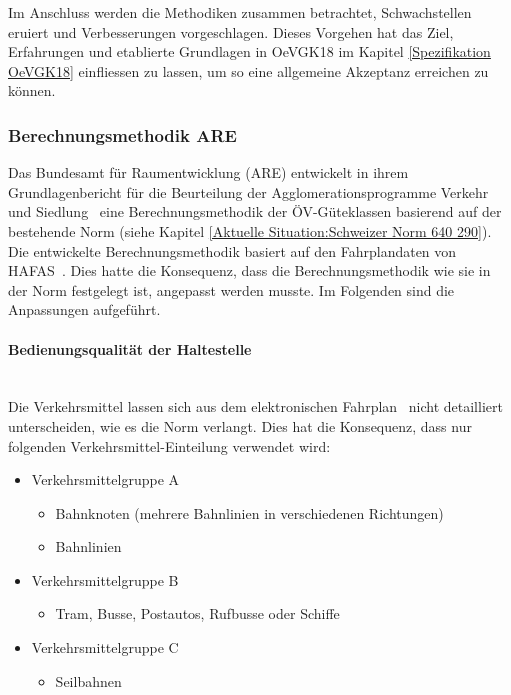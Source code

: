 Im Anschluss werden die Methodiken zusammen betrachtet, Schwachstellen eruiert und Verbesserungen vorgeschlagen.
Dieses Vorgehen hat das Ziel, Erfahrungen und etablierte Grundlagen in \gls{OeVGK18} im Kapitel \ref{Spezifikation OeVGK18} einfliessen zu lassen, um so eine allgemeine Akzeptanz erreichen zu können.

\subsubsection{Berechnungsmethodik ARE}
\label{Lösungsansätze:Berechnungsmethodik ARE}
Das Bundesamt für Raumentwicklung (ARE) entwickelt in ihrem Grundlagenbericht für die Beurteilung der Agglomerationsprogramme Verkehr und Siedlung~\cite{berechnung_are} eine Berechnungsmethodik der \acs{ÖV}-Güteklassen basierend auf der bestehende Norm (siehe Kapitel \ref{Aktuelle Situation:Schweizer Norm 640 290}).
Die entwickelte Berechnungsmethodik basiert auf den Fahrplandaten von HAFAS~\cite{sbb_hafas_spec}.
Dies hatte die Konsequenz, dass die Berechnungsmethodik wie sie in der Norm festgelegt ist, angepasst werden musste.
Im Folgenden sind die Anpassungen aufgeführt.

\paragraph{Bedienungsqualität der Haltestelle}~\\
\label{Berechnungsmethodik ARE:Bedienungsqualität der Haltestelle}
Die Verkehrsmittel lassen sich aus dem elektronischen Fahrplan~\cite{sbb_hafas_spec} nicht detailliert unterscheiden, wie es die Norm verlangt.
Dies hat die Konsequenz, dass nur folgenden Verkehrsmittel-Einteilung verwendet wird:

\begin{itemize}[noitemsep]
    \item Verkehrsmittelgruppe A
    \begin{itemize}
        \item Bahnknoten (mehrere Bahnlinien in verschiedenen Richtungen)
        \item Bahnlinien
    \end{itemize}
    \item Verkehrsmittelgruppe B
    \begin{itemize}
        \item Tram, Busse, Postautos, Rufbusse oder Schiffe
    \end{itemize}
    \item Verkehrsmittelgruppe C
    \begin{itemize}
        \item Seilbahnen
    \end{itemize}
\end{itemize}

